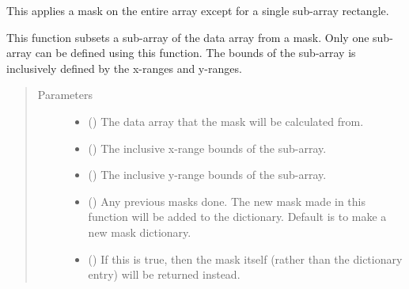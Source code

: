 \documentclass[letterpaper,10pt,english]{sphinxmanual}
\begin{document}
\begin{fulllineitems}
\label{\detokenize{python_docstrings/IfA_Smeargle.echo.masks.masks_echo100:IfA_Smeargle.echo.masks.masks_echo100.echo120_subarray_mask}}
This applies a mask on the entire array except for a single sub-array
rectangle.

This function subsets a sub-array of the data array from a mask. Only one
sub-array can be defined using this function. The bounds of the sub-array
is inclusively defined by the x-ranges and y-ranges.
\begin{quote}\begin{description}
\item[{Parameters}] \leavevmode\begin{itemize}
\item {} 
 () \textendash{} The data array that the mask will be calculated from.

\item {} 
 () \textendash{} The inclusive x-range bounds of the sub-array.

\item {} 
 () \textendash{} The inclusive y-range bounds of the sub-array.

\item {} 
 (\sphinxstyleliteralemphasis{\sphinxupquote{ (}}\sphinxstyleliteralemphasis{\sphinxupquote{)}}) \textendash{} Any previous masks done. The new mask made in this function will be
added to the dictionary. Default is to make a new mask dictionary.

\item {} 
 (\sphinxstyleliteralemphasis{\sphinxupquote{ (}}\sphinxstyleliteralemphasis{\sphinxupquote{)}}) \textendash{} If this is true, then the mask itself (rather than the dictionary
entry) will be returned instead.


\end{itemize}
\end{description}
\end{quote}
\end{fulllineitems}
\end{document}

